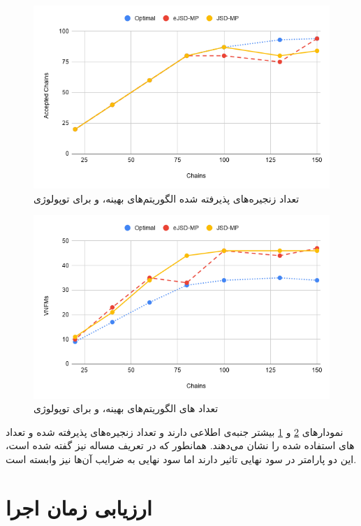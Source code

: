 \begin{figure}[h!]
\center\includegraphics[scale=.7]{images/chart-7}
\caption{تعداد زنجیره‌های پذیرفته شده الگوریتم‌های بهینه،  و  برای توپولوژی }
\label{fig.12}
\end{figure}

\begin{figure}[h!]
\center\includegraphics[scale=.7]{images/chart-8}
\caption{تعداد های الگوریتم‌های بهینه،  و  برای توپولوژی }
\label{fig.13}
\end{figure}

نمودارهای \ref{fig.13} و \ref{fig.12}
بیشتر جنبه‌ی اطلاعی دارند و تعداد زنجیره‌های پذیرفته شده و تعداد
های
استفاده شده را نشان می‌دهند.
همانطور که در تعریف مساله نیز گفته شده است، این دو پارامتر در سود نهایی تاثیر دارند
اما سود نهایی به ضرایب آن‌ها نیز وابسته است.

\section{ارزیابی زمان اجرا}

